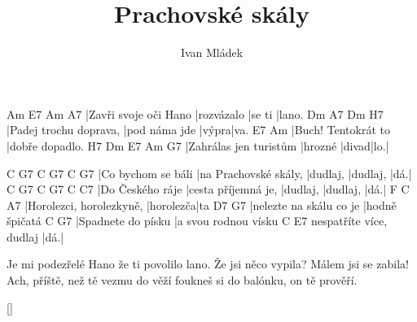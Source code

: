 \documentclass{song}
\title{Prachovské skály}
\author{Ivan Mládek}
\begin{document}
\strophe
Am                    E7         Am     A7
|Zavři svoje oči Hano |rozvázalo |se ti |lano.
Dm                     A7            Dm    H7
|Padej trochu doprava, |pod náma jde |výpra|va.
E7                  Am
|Buch! Tentokrát to |dobře dopadlo.
H7                     Dm      E7    Am  G7
|Zahrálas jen turistům |hrozné |divad|lo.|
\endstrophe

C                  G7                    C        G7       C   G7
|Co bychom se báli |na Prachovské skály, |dudlaj, |dudlaj, |dá.|
C                G7                  C        G7       C   C7
|Do Českého ráje |cesta příjemná je, |dudlaj, |dudlaj, |dá.|
F                        C         A7
|Horolezci, horolezkyně, |horolezča|ta
D7                      G7
|nelezte na skálu co je |hodně špičatá
C                  G7
|Spadnete do písku |a svou rodnou vísku
                        C   E7
nespatříte více, dudlaj |dá.|
\endstrophe

\strophe*
Je mi podezřelé Hano že ti povolilo lano.
Že jsi něco vypila? Málem jsi se zabila!
Ach, příště, než tě vezmu do věží
foukneš si do balónku, on tě prověří.
\endstrophe

\ref{}
\end{document}
